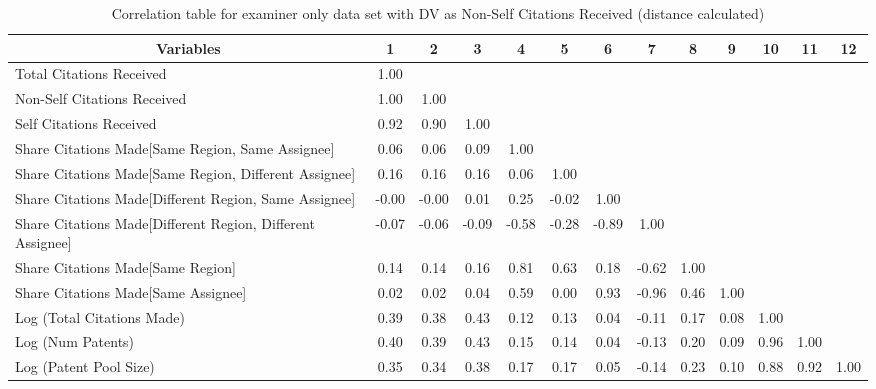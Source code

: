 \begin{sidewaystable}[htbp]\centering \caption{Correlation table for examiner only data set with DV as Non-Self Citations Received (distance calculated)\label{e.ncorrelation}}
\scriptsize
\singlespacing
\begin{tabular}{l  c  c  c  c  c  c  c  c  c  c  c  c }\hline\hline
\multicolumn{1}{c}{Variables} &1&2&3&4&5&6&7&8&9&10&11&12\\ \hline
Total Citations Received&1.00\\
Non-Self Citations Received&1.00&1.00\\
Self Citations Received&0.92&0.90&1.00\\
Share Citations Made[Same Region, Same Assignee]&0.06&0.06&0.09&1.00\\
Share Citations Made[Same Region, Different Assignee]&0.16&0.16&0.16&0.06&1.00\\
Share Citations Made[Different Region, Same Assignee]&-0.00&-0.00&0.01&0.25&-0.02&1.00\\
Share Citations Made[Different Region, Different Assignee]&-0.07&-0.06&-0.09&-0.58&-0.28&-0.89&1.00\\
Share Citations Made[Same Region]&0.14&0.14&0.16&0.81&0.63&0.18&-0.62&1.00\\
Share Citations Made[Same Assignee]&0.02&0.02&0.04&0.59&0.00&0.93&-0.96&0.46&1.00\\
Log (Total Citations Made)&0.39&0.38&0.43&0.12&0.13&0.04&-0.11&0.17&0.08&1.00\\
Log (Num Patents)&0.40&0.39&0.43&0.15&0.14&0.04&-0.13&0.20&0.09&0.96&1.00\\
Log (Patent Pool Size)&0.35&0.34&0.38&0.17&0.17&0.05&-0.14&0.23&0.10&0.88&0.92&1.00\\
\hline \hline 
 \end{tabular}
\end{sidewaystable}
